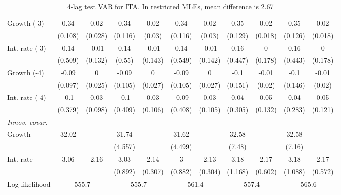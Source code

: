 \begin{table}[htbp]
\begin{tabular}{@{\extracolsep{4pt}}lcccccccccc@{}}
\quad Growth (-3) 	 &0.34 	 & 0.02 	 & 0.34 	 & 0.02 	 & 0.34 	 & 0.02 	 & 0.35 	 & 0.02 	 & 0.35 	 & 0.02	 \\ 
 		 & (0.108) 	 & (0.028) 	 & (0.116) 	 & (0.03) 	 & (0.116) 	 & (0.03) 	 & (0.129) 	 & (0.018) 	 & (0.126) 	 & (0.018) 	 \\ 
\quad Int. rate (-3) 	 &0.14 	 & -0.01 	 & 0.14 	 & -0.01 	 & 0.14 	 & -0.01 	 & 0.16 	 & 0 	 & 0.16 	 & 0	 \\ 
 		 & (0.509) 	 & (0.132) 	 & (0.55) 	 & (0.143) 	 & (0.549) 	 & (0.142) 	 & (0.447) 	 & (0.178) 	 & (0.443) 	 & (0.178) 	 \\ 
\quad Growth (-4) 	 &-0.09 	 & 0 	 & -0.09 	 & 0 	 & -0.09 	 & 0 	 & -0.1 	 & -0.01 	 & -0.1 	 & -0.01	 \\ 
 		 & (0.097) 	 & (0.025) 	 & (0.105) 	 & (0.027) 	 & (0.105) 	 & (0.027) 	 & (0.151) 	 & (0.02) 	 & (0.146) 	 & (0.02) 	 \\ 
\quad Int. rate (-4) 	 &-0.1 	 & 0.03 	 & -0.1 	 & 0.03 	 & -0.09 	 & 0.03 	 & 0.04 	 & 0.05 	 & 0.04 	 & 0.05	 \\ 
 		 & (0.379) 	 & (0.098) 	 & (0.409) 	 & (0.106) 	 & (0.408) 	 & (0.105) 	 & (0.305) 	 & (0.132) 	 & (0.283) 	 & (0.121) 	 \\ 
\rule{0pt}{4ex} \emph{Innov. covar.}  	 & 	 & 	 & 	 & 	 & 	 & 	 & 	 & 	 & 	 &\\ 
\quad Growth 	 &32.02 	 &  	 & 31.74 	 &  	 & 31.62 	 &  	 & 32.58 	 &  	 & 32.58 	 & 	 \\ 
 		 &  	 &  	 & (4.557) 	 &  	 & (4.499) 	 &  	 & (7.48) 	 &  	 & (7.16) 	 &  	 \\ 
\quad Int. rate 	 &3.06 	 & 2.16 	 & 3.03 	 & 2.14 	 & 3 	 & 2.13 	 & 3.18 	 & 2.17 	 & 3.18 	 & 2.17	 \\ 
 		 &  	 &  	 & (0.892) 	 & (0.307) 	 & (0.882) 	 & (0.304) 	 & (1.168) 	 & (0.602) 	 & (1.088) 	 & (0.572) 	 \\ 
 \hline \rule{0pt}{4ex} 
  Log likelihood 	 &\multicolumn{2}{c}{555.7} 	 & \multicolumn{2}{c}{555.7} 	 & \multicolumn{2}{c}{561.4} 	 & \multicolumn{2}{c}{557.4} 	 & \multicolumn{2}{c}{565.6}\\ 

 \hline 	\end{tabular}		\caption{4-lag test VAR for ITA. In restricted MLEs, mean difference is 2.67}
		\label{tab:ITA4}

\end{table}